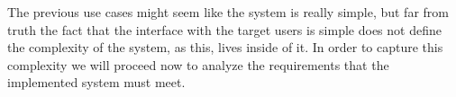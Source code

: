 \bigskip
The previous use cases might seem like the system is really simple, but far from truth the
fact that the interface with the target users is simple does not define the complexity of the
system, as this, lives inside of it. In order to capture this complexity we will proceed now to
analyze the requirements that the implemented system must meet. 